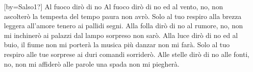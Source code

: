 [by={Salso1?}]
\beginverse
Al fuoco dirò di no
Al fuoco dirò di no
ed al vento,
no, non ascolterò la tempesta
del tempo paura non avrò.
\endverse
\beginchorus
Solo al tuo respiro
alla brezza leggera
all'amore tenero
ai pallidi segni.
\endchorus
\beginverse
Alla folla dirò di no
al rumore,
no, non mi inchinerò ai palazzi
dal lampo sorpreso non sarò.
Alla luce dirò di no
ed al buio,
il fiume non mi porterà
la musica più danzar non mi farà.
\endverse
\beginchorus
Solo al tuo respiro
alle tue sorprese
ai duri comandi
sorriderò.
\endchorus
\beginverse
Alle stelle dirò di no
alle fonti,
no, non mi affiderò alle parole
una spada non mi piegherà.
\endverse
\endsong
